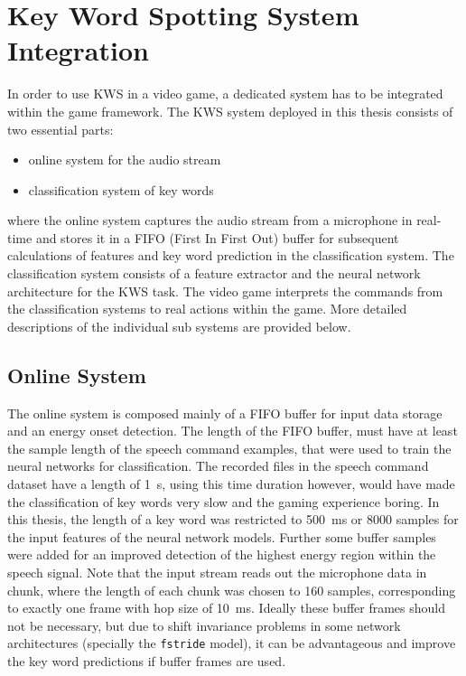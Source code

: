 
\section{Key Word Spotting System Integration}
\thesisStateReady
In order to use KWS in a video game, a dedicated system has to be integrated within the game framework.
The KWS system deployed in this thesis consists of two essential parts:
\begin{itemize}
	\item online system for the audio stream
	\item classification system of key words
\end{itemize}
where the online system captures the audio stream from a microphone in real-time and stores it in a FIFO (First In First Out) buffer for subsequent calculations of features and key word prediction in the classification system.
The classification system consists of a feature extractor and the neural network architecture for the KWS task.
The video game interprets the commands from the classification systems to real actions within the game.
More detailed descriptions of the individual sub systems are provided below.



\subsection{Online System}
The online system is composed mainly of a FIFO buffer for input data storage and an energy onset detection.
The length of the FIFO buffer, must have at least the sample length of the speech command examples, that were used to train the neural networks for classification.
The recorded files in the speech command dataset have a length of \SI{1}{\second}, using this time duration however, would have made the classification of key words very slow and the gaming experience boring.
In this thesis, the length of a key word was restricted to \SI{500}{\milli\second} or 8000 samples for the input features of the neural network models.
Further some buffer samples were added for an improved detection of the highest energy region within the speech signal.
Note that the input stream reads out the microphone data in chunk, where the length of each chunk was chosen to 160 samples, corresponding to exactly one frame with hop size of \SI{10}{\milli\second}.
Ideally these buffer frames should not be necessary, but due to shift invariance problems in some network architectures (specially the \texttt{fstride} model), it can be advantageous and improve the key word predictions if buffer frames are used.


